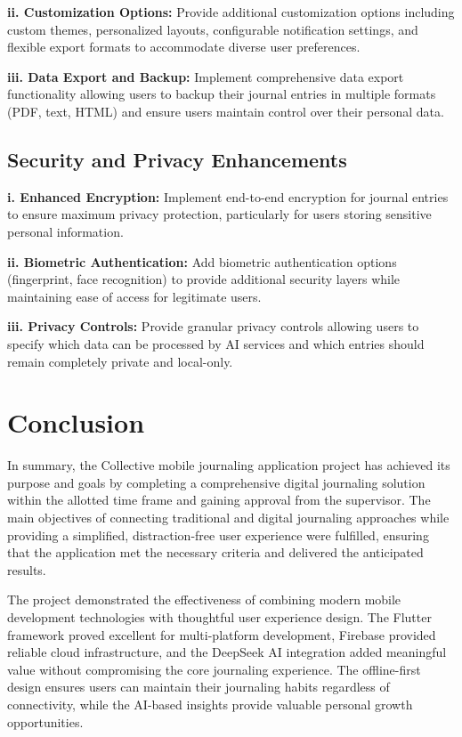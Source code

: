 \textbf{ii. Customization Options:} Provide additional customization options including custom themes, personalized layouts, configurable notification settings, and flexible export formats to accommodate diverse user preferences.

\textbf{iii. Data Export and Backup:} Implement comprehensive data export functionality allowing users to backup their journal entries in multiple formats (PDF, text, HTML) and ensure users maintain control over their personal data.

\subsection{Security and Privacy Enhancements}

\textbf{i. Enhanced Encryption:} Implement end-to-end encryption for journal entries to ensure maximum privacy protection, particularly for users storing sensitive personal information.

\textbf{ii. Biometric Authentication:} Add biometric authentication options (fingerprint, face recognition) to provide additional security layers while maintaining ease of access for legitimate users.

\textbf{iii. Privacy Controls:} Provide granular privacy controls allowing users to specify which data can be processed by AI services and which entries should remain completely private and local-only.

\section{Conclusion}\label{sec:conclusion}

In summary, the Collective mobile journaling application project has achieved its purpose and goals by completing a comprehensive digital journaling solution within the allotted time frame and gaining approval from the supervisor. The main objectives of connecting traditional and digital journaling approaches while providing a simplified, distraction-free user experience were fulfilled, ensuring that the application met the necessary criteria and delivered the anticipated results.

The project demonstrated the effectiveness of combining modern mobile development technologies with thoughtful user experience design. The Flutter framework proved excellent for multi-platform development, Firebase provided reliable cloud infrastructure, and the DeepSeek AI integration added meaningful value without compromising the core journaling experience. The offline-first design ensures users can maintain their journaling habits regardless of connectivity, while the AI-based insights provide valuable personal growth opportunities.

